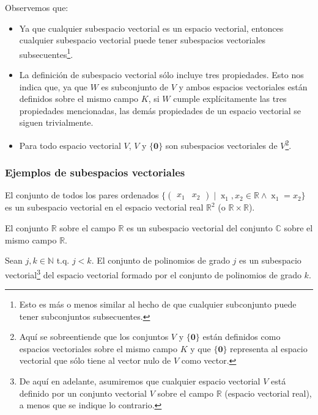 \documentclass[apuntes]{subfiles}
\begin{document}
Observemos que:

\begin{itemize}
    \item Ya que cualquier subespacio vectorial es un espacio vectorial, entonces cualquier subespacio vectorial puede tener subespacios vectoriales subsecuentes\footnote{Esto es más o menos similar al hecho de que cualquier subconjunto puede tener subconjuntos subsecuentes.}.
    \item La definición de subespacio vectorial sólo incluye tres propiedades. Esto nos indica que, ya que $W$ es subconjunto de $V$ y ambos espacios vectoriales están definidos sobre el mismo campo $K$, si $W$ cumple explícitamente las tres propiedades mencionadas, las demás propiedades de un espacio vectorial se siguen trivialmente.
    \item Para todo espacio vectorial $V$, $V$ y $\{\mathbf{0}\}$ son subespacios vectoriales de $V$\footnote{Aquí se sobreentiende que los conjuntos $V$ y $\{\mathbf{0}\}$ están definidos como espacios vectoriales sobre el mismo campo $K$ y que $\{\mathbf{0}\}$ representa al espacio vectorial que sólo tiene al vector nulo de $V$ como vector.}.
\end{itemize}{}

\subsubsection*{Ejemplos de subespacios vectoriales}

El conjunto de todos los pares ordenados $\{\begin{pmatrix} x_1&x_2\end{pmatrix}\mathop |\mathop x_1,x_2\in\mathbb{R}\mathop\land\mathop x_1=x_2\}$ es un subespacio vectorial en el espacio vectorial real $\mathbb{R}^2$ (o $\mathbb{R}\times \mathbb{R}$).

\vspace{3mm}

El conjunto $\mathbb{R}$ sobre el campo $\mathbb{R}$ es un subespacio vectorial del conjunto $\mathbb{C}$ sobre el mismo campo $\mathbb{R}$.

\vspace{3mm}

Sean $j,k\in\mathbb{N}$ t.q. $j<k$. El conjunto de polinomios de grado $j$ es un subespacio vectorial\footnote{De aquí en adelante, asumiremos que cualquier espacio vectorial $V$ está definido por un conjunto vectorial $V$ sobre el campo $\mathbb{R}$ (espacio vectorial real), a menos que se indique lo contrario.} del espacio vectorial formado por el conjunto de polinomios de grado $k$.
\end{document}
